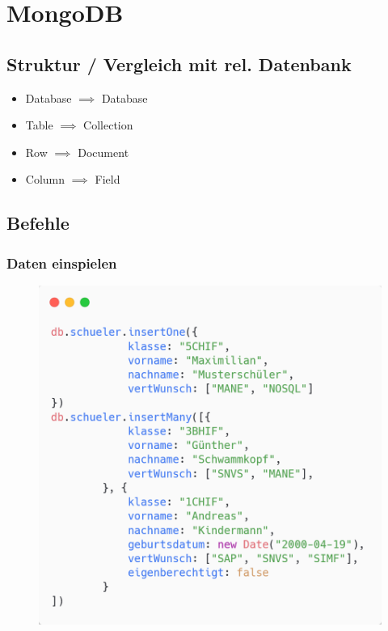 \section{MongoDB}

\subsection{Struktur / Vergleich mit rel. Datenbank}
\begin{itemize}
    \item Database $\implies$ Database
    \item Table $\implies$ Collection
    \item Row $\implies$ Document
    \item Column $\implies$ Field
\end{itemize}

\subsection{Befehle}
\subsubsection{Daten einspielen}
\begin{figure}[H]
    \centering
    \includegraphics[scale=.2]{res/themenkorb_8/mongo_insert.png}
\end{figure}

